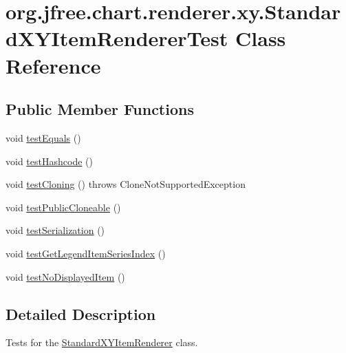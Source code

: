 \hypertarget{classorg_1_1jfree_1_1chart_1_1renderer_1_1xy_1_1_standard_x_y_item_renderer_test}{}\section{org.\+jfree.\+chart.\+renderer.\+xy.\+Standard\+X\+Y\+Item\+Renderer\+Test Class Reference}
\label{classorg_1_1jfree_1_1chart_1_1renderer_1_1xy_1_1_standard_x_y_item_renderer_test}
\subsection*{Public Member Functions}
\begin{DoxyCompactItemize}
\item 
void \mbox{\hyperlink{classorg_1_1jfree_1_1chart_1_1renderer_1_1xy_1_1_standard_x_y_item_renderer_test_a4b18301fcca470a62abf79549ecd4c3c}{test\+Equals}} ()
\item 
void \mbox{\hyperlink{classorg_1_1jfree_1_1chart_1_1renderer_1_1xy_1_1_standard_x_y_item_renderer_test_adf6d947d30527b341058e515b2c34402}{test\+Hashcode}} ()
\item 
void \mbox{\hyperlink{classorg_1_1jfree_1_1chart_1_1renderer_1_1xy_1_1_standard_x_y_item_renderer_test_ab97deed3aacdee52bebdc41623504373}{test\+Cloning}} ()  throws Clone\+Not\+Supported\+Exception 
\item 
void \mbox{\hyperlink{classorg_1_1jfree_1_1chart_1_1renderer_1_1xy_1_1_standard_x_y_item_renderer_test_a3dc8cd5152d99c93ea84d2eba7af161e}{test\+Public\+Cloneable}} ()
\item 
void \mbox{\hyperlink{classorg_1_1jfree_1_1chart_1_1renderer_1_1xy_1_1_standard_x_y_item_renderer_test_ab0b9b2eedd632731ba002207dcca0042}{test\+Serialization}} ()
\item 
void \mbox{\hyperlink{classorg_1_1jfree_1_1chart_1_1renderer_1_1xy_1_1_standard_x_y_item_renderer_test_a47f4301c6a74f14b6f36cfb2cf5063d2}{test\+Get\+Legend\+Item\+Series\+Index}} ()
\item 
void \mbox{\hyperlink{classorg_1_1jfree_1_1chart_1_1renderer_1_1xy_1_1_standard_x_y_item_renderer_test_aa4648de30f901a246a0b0efac42c844d}{test\+No\+Displayed\+Item}} ()
\end{DoxyCompactItemize}


\subsection{Detailed Description}
Tests for the \mbox{\hyperlink{classorg_1_1jfree_1_1chart_1_1renderer_1_1xy_1_1_standard_x_y_item_renderer}{Standard\+X\+Y\+Item\+Renderer}} class. 

